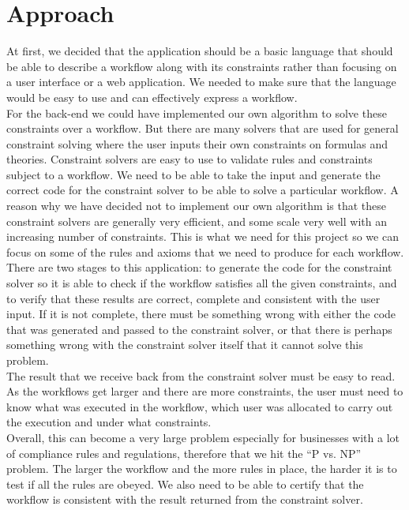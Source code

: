 \documentclass[a4paper]{report}
\begin{document}
\section{Approach}
At first, we decided that the application should be a basic language that should be able to describe a workflow along with its constraints rather than focusing on a user interface or a web application. We needed to make sure that the language would be easy to use and can effectively express a workflow. \\

For the back-end we could have implemented our own algorithm to solve these constraints over a workflow. But there are many solvers that are used for general constraint solving where the user inputs their own constraints on formulas and theories. Constraint solvers are easy to use to validate rules and constraints subject to a workflow. We need to be able to take the input and generate the correct code for the constraint solver to be able to solve a particular workflow. A reason why we have decided not to implement our own algorithm is that these constraint solvers are generally very efficient, and some scale very well with an increasing number of constraints. This is what we need for this project so we can focus on some of the rules and axioms that we need to produce for each workflow. \\

There are two stages to this application: to generate the code for the constraint solver so it is able to check if the workflow satisfies all the given constraints, and to verify that these results are correct, complete and consistent with the user input. If it is not complete, there must be something wrong with either the code that was generated and passed to the constraint solver, or that there is perhaps something wrong with the constraint solver itself that it cannot solve this problem. \\

The result that we receive back from the constraint solver must be easy to read. As the workflows get larger and there are more constraints, the user must need to know what was executed in the workflow, which user was allocated to carry out the execution and under what constraints. \\

Overall, this can become a very large problem especially for businesses with a lot of compliance rules and regulations, therefore that we hit the ``P vs. NP'' problem. The larger the workflow and the more rules in place, the harder it is to test if all the rules are obeyed. We also need to be able to certify that the workflow is consistent with the result returned from the constraint solver. \\
\end{document}
